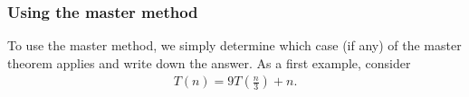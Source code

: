 \documentclass{report}
\begin{document}
        \subsubsection{Using the master method}
        \bigbreak \noindent 
        To use the master method, we simply determine which case (if any) of the master theorem applies and write down the answer.
        \bigbreak \noindent 
        As a first example, consider
        \begin{align*}
            T(n) = 9T\left(\frac{n}{3}\right) + n
        .\end{align*}















































        

    
\end{document}
